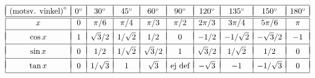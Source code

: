 \documentclass{article}
\begin{document}
{%
\let\F\frac
\newcommand\CC[1]{#1^\circ}
\def\myEnd{\\*[2pt]\hline &&&&&&&&& \\*[-9pt]}
\def\myEnd{\\*[2pt]\hline &&&&&&&&& \\*[-9pt]}
\newcommand\tW{{\sqrt2}}
\newcommand\tH{{\sqrt3}}
$
\begin{array}{|c|c|c|c|c|c|c|c|c|c|}
\hline & & & & & & & & &\\*[-10pt]
\mbox{(motsv. vinkel)}^\circ
  & \CC{0} &\CC{30} &\CC{45} &\CC{60} &\CC{90} &\CC{120} &\CC{135} &\CC{150} &\CC{180}
 \\\hline\hline
 x 
       & 0     & \pi/6 & \pi/4 &  \pi/3 & \pi/2 & 2\pi/3 & 3\pi/4 & 5\pi/6 &\pi 
 \myEnd 
 \cos x&   1   & \tH/2 & 1/\tW &  1/2  &   0   & -1/2   & -1/\tW & -\tH/2 & -1 
 \myEnd
 \sin x&   0   &   1/2 & 1/\tW & \tH/2 &   1   & \tH/2  &  1/\tW &   1/2  &  0 
 \myEnd
 \tan x&   0   & 1/\tH &   1   & \tH   &
                                    \mbox{ej def}
                                                &-\tH  &    -1  & -1/\tH &  0 
 \\*[2pt]\hline
\end{array}
$
}

\end{document}
